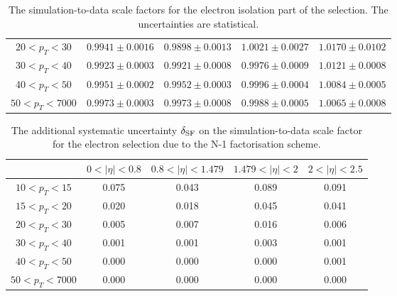 \begin{table}[!ht]
\begin{center}
\begin{tabular}{c|c|c|c|c}
$ 20 < p_T <  30$ & $0.9941 \pm 0.0016$ & $0.9898 \pm 0.0013$ & $1.0021 \pm 0.0027$ & $1.0170 \pm 0.0102$  \\
$ 30 < p_T <  40$ & $0.9923 \pm 0.0003$ & $0.9921 \pm 0.0008$ & $0.9976 \pm 0.0009$ & $1.0121 \pm 0.0008$  \\
$ 40 < p_T <  50$ & $0.9951 \pm 0.0002$ & $0.9952 \pm 0.0003$ & $0.9996 \pm 0.0004$ & $1.0084 \pm 0.0005$  \\
$ 50 < p_T < 7000$ & $0.9973 \pm 0.0003$ & $0.9973 \pm 0.0008$ & $0.9988 \pm 0.0005$ & $1.0065 \pm 0.0008$  \\
\hline
\end{tabular}
\caption{The simulation-to-data scale factors for the electron
isolation part of the selection.
The uncertainties are statistical.}
\label{tab:eff_electron_iso}
\end{center}
\end{table}

\begin{table}[!ht]
\begin{center}
\begin{tabular}{c|c|c|c|c}
\hline & $0 < |\eta| < 0.8$ & $0.8 < |\eta| < 1.479$ & $1.479 < |\eta| < 2$ & $2 < |\eta| < 2.5$  \\
\hline
$ 10 < p_T <  15$ &    0.075  &     0.043  &     0.089  &     0.091  \\
$ 15 < p_T <  20$ &    0.020  &     0.018  &     0.045  &     0.041  \\
$ 20 < p_T <  30$ &    0.005  &     0.007  &     0.016  &     0.006  \\
$ 30 < p_T <  40$ &    0.001  &     0.001  &     0.003  &     0.001  \\
$ 40 < p_T <  50$ &    0.000  &     0.000  &     0.000  &     0.001  \\
$ 50 < p_T < 7000$ &   0.000  &     0.000  &     0.000  &     0.000  \\
\hline
\end{tabular}
\caption{The additional systematic uncertainty $\delta_{\rm{SF}}$ on the simulation-to-data scale factor 
for the electron selection due to the N-1 factorisation scheme.}
\label{tab:eff_electron_syst}
\end{center}
\end{table}



